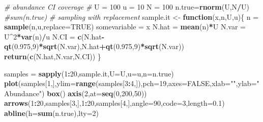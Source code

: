 \documentclass[]{book}
\newenvironment{Shaded}{\begin{snugshade}}{\end{snugshade}}
\newcommand{\CommentTok}[1]{\textcolor[rgb]{0.56,0.35,0.01}{\textit{#1}}}
\newcommand{\ControlFlowTok}[1]{\textcolor[rgb]{0.13,0.29,0.53}{\textbf{#1}}}
\newcommand{\DataTypeTok}[1]{\textcolor[rgb]{0.13,0.29,0.53}{#1}}
\newcommand{\DecValTok}[1]{\textcolor[rgb]{0.00,0.00,0.81}{#1}}
\newcommand{\FloatTok}[1]{\textcolor[rgb]{0.00,0.00,0.81}{#1}}
\newcommand{\KeywordTok}[1]{\textcolor[rgb]{0.13,0.29,0.53}{\textbf{#1}}}
\newcommand{\NormalTok}[1]{#1}
\newcommand{\OperatorTok}[1]{\textcolor[rgb]{0.81,0.36,0.00}{\textbf{#1}}}
\newcommand{\OtherTok}[1]{\textcolor[rgb]{0.56,0.35,0.01}{#1}}
\newcommand{\StringTok}[1]{\textcolor[rgb]{0.31,0.60,0.02}{#1}}
\theoremstyle{definition}
\theoremstyle{definition}
\theoremstyle{definition}
\theoremstyle{remark}
\begin{document}
\begin{Shaded}
\begin{Highlighting}[]
\CommentTok{# abundance CI coverage}
\CommentTok{# }
\NormalTok{U =}\StringTok{ }\DecValTok{100}
\NormalTok{u =}\StringTok{ }\DecValTok{10}
\NormalTok{N =}\StringTok{ }\DecValTok{100}
\NormalTok{n.true=}\KeywordTok{rnorm}\NormalTok{(U,N}\OperatorTok{/}\NormalTok{U)}
\CommentTok{#sum(n.true)}
\CommentTok{# sampling with replacement}
\NormalTok{sample.it <-}\StringTok{ }\ControlFlowTok{function}\NormalTok{(x,n,U,u)\{}
\NormalTok{  n =}\StringTok{ }\KeywordTok{sample}\NormalTok{(n,u,}\DataTypeTok{replace=}\OtherTok{TRUE}\NormalTok{)}
\NormalTok{  somevariable =}\StringTok{ }\NormalTok{x}
\NormalTok{  N.hat =}\StringTok{ }\KeywordTok{mean}\NormalTok{(n)}\OperatorTok{*}\NormalTok{U}
\NormalTok{  N.var =}\StringTok{ }\NormalTok{U}\OperatorTok{^}\DecValTok{2}\OperatorTok{*}\KeywordTok{var}\NormalTok{(n)}\OperatorTok{/}\NormalTok{u}
\NormalTok{  N.CI =}\StringTok{ }\KeywordTok{c}\NormalTok{(N.hat}\OperatorTok{-}\KeywordTok{qt}\NormalTok{(}\FloatTok{0.975}\NormalTok{,}\DecValTok{9}\NormalTok{)}\OperatorTok{*}\KeywordTok{sqrt}\NormalTok{(N.var),N.hat}\OperatorTok{+}\KeywordTok{qt}\NormalTok{(}\FloatTok{0.975}\NormalTok{,}\DecValTok{9}\NormalTok{)}\OperatorTok{*}\KeywordTok{sqrt}\NormalTok{(N.var))}
  \KeywordTok{return}\NormalTok{(}\KeywordTok{c}\NormalTok{(N.hat,N.var,N.CI))}
\NormalTok{\}}

\NormalTok{samples =}\StringTok{ }\KeywordTok{sapply}\NormalTok{(}\DecValTok{1}\OperatorTok{:}\DecValTok{20}\NormalTok{,sample.it,}\DataTypeTok{U=}\NormalTok{U,}\DataTypeTok{u=}\NormalTok{u,}\DataTypeTok{n=}\NormalTok{n.true)}
\KeywordTok{plot}\NormalTok{(samples[}\DecValTok{1}\NormalTok{,],}\DataTypeTok{ylim=}\KeywordTok{range}\NormalTok{(samples[}\DecValTok{3}\OperatorTok{:}\DecValTok{4}\NormalTok{,]),}\DataTypeTok{pch=}\DecValTok{19}\NormalTok{,}\DataTypeTok{axes=}\OtherTok{FALSE}\NormalTok{,}\DataTypeTok{xlab=}\StringTok{""}\NormalTok{,}\DataTypeTok{ylab=}\StringTok{"Abundance"}\NormalTok{)}
\KeywordTok{box}\NormalTok{()}
\KeywordTok{axis}\NormalTok{(}\DecValTok{2}\NormalTok{,}\DataTypeTok{at=}\KeywordTok{seq}\NormalTok{(}\DecValTok{0}\NormalTok{,}\DecValTok{200}\NormalTok{,}\DecValTok{50}\NormalTok{))}
\KeywordTok{arrows}\NormalTok{(}\DecValTok{1}\OperatorTok{:}\DecValTok{20}\NormalTok{,samples[}\DecValTok{3}\NormalTok{,],}\DecValTok{1}\OperatorTok{:}\DecValTok{20}\NormalTok{,samples[}\DecValTok{4}\NormalTok{,],}\DataTypeTok{angle=}\DecValTok{90}\NormalTok{,}\DataTypeTok{code=}\DecValTok{3}\NormalTok{,}\DataTypeTok{length=}\FloatTok{0.1}\NormalTok{)}
\KeywordTok{abline}\NormalTok{(}\DataTypeTok{h=}\KeywordTok{sum}\NormalTok{(n.true),}\DataTypeTok{lty=}\DecValTok{2}\NormalTok{)}
\end{Highlighting}
\end{Shaded}
\end{document}
